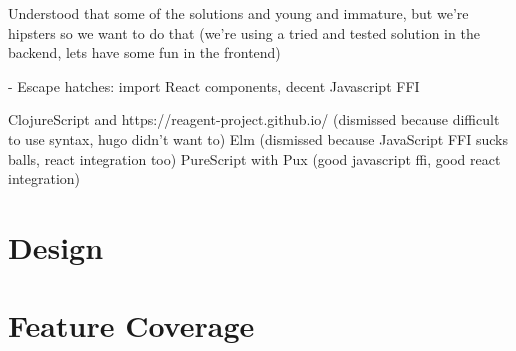 \documentclass[11pt,a4paper]{report}
\begin{document}
Understood that some of the solutions and young and immature, but we're hipsters so we want to do that (we're using a tried and tested solution in the backend, lets have some fun in the frontend)

- Escape hatches: import React components, decent Javascript FFI

ClojureScript and https://reagent-project.github.io/ (dismissed because difficult to use syntax, hugo didn't want to)
Elm (dismissed because JavaScript FFI sucks balls, react integration too)
PureScript with Pux (good javascript ffi, good react integration)


\chapter{Design}

\chapter{Feature Coverage}



\end{document}
